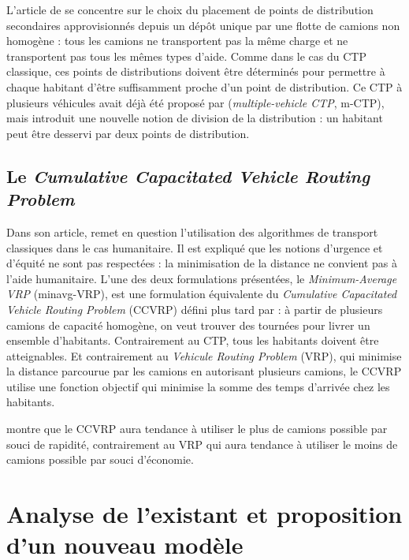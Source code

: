 \documentclass[5p,authoryear]{elsarticle}
\begin{document}
L’article de \cite{naji-azimi_covering_2012} se concentre sur le choix du placement de points de distribution secondaires approvisionnés depuis un dépôt unique par une flotte de camions non homogène : tous les camions ne transportent pas la même charge et ne transportent pas tous les mêmes types d'aide. Comme dans le cas du CTP classique, ces points de distributions doivent être déterminés pour permettre à chaque habitant d'être suffisamment proche d'un point de distribution. Ce CTP à plusieurs véhicules avait déjà été proposé par \cite{hachicha_heuristics_2000} (\emph{multiple-vehicle CTP}, m-CTP), mais \cite{naji-azimi_covering_2012} introduit une nouvelle notion de division de la distribution : un habitant peut être desservi par deux points de distribution. %

\subsection{Le \emph{Cumulative Capacitated Vehicle Routing Problem}} \label{ccvrp}

Dans son article, \cite{campbell_routing_2008} remet en question l'utilisation des algorithmes de transport classiques dans le cas humanitaire. Il est expliqué que les notions d'urgence et d'équité ne sont pas respectées : la minimisation de la distance ne convient pas à l'aide humanitaire. L'une des deux formulations présentées, le \emph{Minimum-Average VRP} (minavg-VRP), est une formulation équivalente du \emph{Cumulative Capacitated Vehicle Routing Problem} (CCVRP) défini plus tard par  \cite{ngueveu_effective_2010} : à partir de plusieurs camions de capacité homogène, on veut trouver des tournées pour livrer un ensemble d'habitants. Contrairement au CTP, tous les habitants doivent être atteignables. Et contrairement au \emph{Vehicule Routing Problem} (VRP), qui minimise la distance parcourue par les camions en autorisant plusieurs camions, le CCVRP utilise une fonction objectif qui minimise la somme des temps d'arrivée chez les habitants.

\cite{ngueveu_effective_2010} montre que le CCVRP  aura tendance à utiliser le plus de camions possible par souci de rapidité, contrairement au VRP qui aura tendance à utiliser le moins de camions possible par souci d'économie.

\section{Analyse de l'existant et proposition d'un nouveau modèle}
\end{document}
